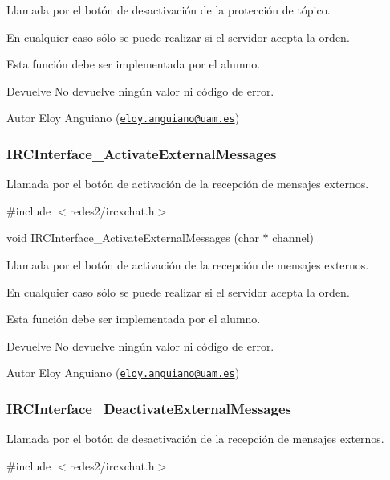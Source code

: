 Llamada por el botón de desactivación de la protección de tópico.

En cualquier caso sólo se puede realizar si el servidor acepta la orden.

Esta función debe ser implementada por el alumno.

\begin{DoxyReturn}{Devuelve}
No devuelve ningún valor ni código de error.
\end{DoxyReturn}
\begin{DoxyAuthor}{Autor}
Eloy Anguiano (\href{mailto:eloy.anguiano@uam.es}{\tt eloy.\-anguiano@uam.\-es})
\end{DoxyAuthor}


 \hypertarget{IRCInterface_ActivateExternalMessages}{}\subsubsection{I\-R\-C\-Interface\-\_\-\-Activate\-External\-Messages}\label{IRCInterface_ActivateExternalMessages}
Llamada por el botón de activación de la recepción de mensajes externos.

\#include $<$redes2/ircxchat.\-h$>$

void I\-R\-C\-Interface\-\_\-\-Activate\-External\-Messages (char $\ast$ channel)

Llamada por el botón de activación de la recepción de mensajes externos.

En cualquier caso sólo se puede realizar si el servidor acepta la orden.

Esta función debe ser implementada por el alumno.

\begin{DoxyReturn}{Devuelve}
No devuelve ningún valor ni código de error.
\end{DoxyReturn}
\begin{DoxyAuthor}{Autor}
Eloy Anguiano (\href{mailto:eloy.anguiano@uam.es}{\tt eloy.\-anguiano@uam.\-es})
\end{DoxyAuthor}


 \hypertarget{IRCInterface_DeactivateExternalMessages}{}\subsubsection{I\-R\-C\-Interface\-\_\-\-Deactivate\-External\-Messages}\label{IRCInterface_DeactivateExternalMessages}
Llamada por el botón de desactivación de la recepción de mensajes externos.

\#include $<$redes2/ircxchat.\-h$>$

